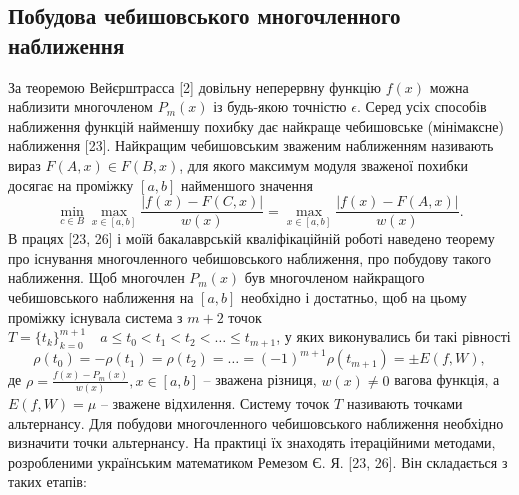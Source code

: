 \documentclass[ukrainian,14pt]{extarticle}
\begin{document}
\subsection{Побудова чебишовського многочленного наближення}
За теоремою Вейєрштрасса [2] довільну неперервну функцію $f(x)$  можна наблизити многочленом $P_m(x)$ із будь-якою точністю $\epsilon$. Серед усіх способів наближення функцій найменшу похибку дає найкраще чебишовське (мінімаксне) наближення [23]. Найкращим чебишовським зваженим наближенням називають вираз $F(A, x) \in F(B, x)$, для якого максимум модуля зваженої похибки досягає на проміжку $[a, b]$ найменшого значення
\begin{equation}\label{eq:formula1}
    \min_{c \in B} \max_{x \in [a,b]} \frac{|f(x) - F(C,x)|}{w(x)} = \max_{x \in [a,b]} \frac{|f(x) - F(A,x)|}{w(x)}.
\end{equation}
В працях [23, 26] і моїй бакалаврській кваліфікаційній роботі наведено теорему про існування многочленного чебишовського наближення, про побудову такого наближення. Щоб многочлен $P_m(x)$ був многочленом найкращого чебишовського наближення на $[a, b]$ необхідно і достатньо, щоб на цьому проміжку існувала система з $m+2$ точок $T=\{t_k\}_{k=0}^{m+1} \quad a \leq t_0 < t_1 < t_2 < \ldots \leq t_{m+1}$, у яких виконувались би такі рівності
\begin{equation}\label{eq:formula2}
    \rho(t_0) = -\rho(t_1) = \rho(t_2) = \ldots = (-1)^{m+1}\rho(t_{m+1}) = \pm E(f,W),
\end{equation}
де $\rho = \frac{f(x) - P_m(x)}{w(x)}, x \in [a, b]$  – зважена різниця, $w(x) \neq 0$ вагова функція, а $E(f,W) = \mu$ – зважене відхилення. Систему точок $T$ називають точками альтернансу. Для побудови многочленного чебишовського наближення необхідно визначити точки альтернансу. На практиці їх знаходять ітераційними методами, розробленими українським математиком Ремезом Є. Я. [23, 26]. Він складається з таких етапів:
\end{document}

